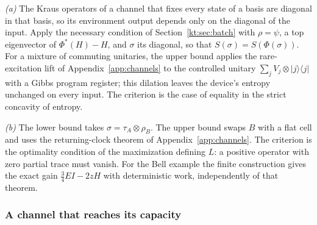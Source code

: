 \emph{(a)} The Kraus operators of a channel that fixes every state of a basis are diagonal in that basis, so its environment output depends only on the diagonal of the input. Apply the necessary condition of Section~\ref{kt:sec:batch} with $\rho=\psi$, a top eigenvector of $\Phi^*(H)-H$, and $\sigma$ its diagonal, so that $S(\sigma)=S(\Phi(\sigma))$. For a mixture of commuting unitaries, the upper bound applies the rare-excitation lift of Appendix~\ref{app:channels} to the controlled unitary $\sum_jV_j\otimes|j\rangle\langle j|$ with a Gibbs program register; this dilation leaves the device's entropy unchanged on every input. The criterion is the case of equality in the strict concavity of entropy.

\emph{(b)} The lower bound takes $\sigma=\tau_A\otimes\rho_B$. The upper bound swaps $B$ with a flat cell and uses the returning-clock theorem of Appendix~\ref{app:channels}. The criterion is the optimality condition of the maximization defining $L$: a positive operator with zero partial trace must vanish. For the Bell example the finite construction gives the exact gain $\tfrac34EI-2zH$ with deterministic work, independently of that theorem.

\subsubsection{A channel that reaches its capacity}\label{kt:pf:reach}

